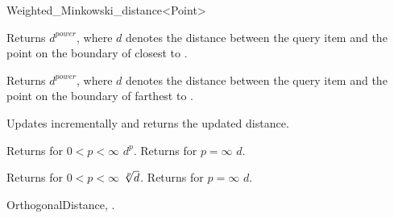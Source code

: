 \begin{ccRefClass}{Weighted_Minkowski_distance<Point>}
\ccOperations



{Returns $d^{power}$, where $d$ denotes the distance between the query item  and
the point on the boundary of  closest to .}

{Returns $d^{power}$, where $d$ denotes the distance between the query item  and
the point on the boundary of  farthest to .}

 {Updates  incrementally
and returns the updated distance.}

 {Returns for $0 < p <\infty$ $d^p$. Returns for $p=\infty$ $d$.}

 {Returns for $0 < p <\infty$ $\root p\of{d}$. Returns for $p=\infty$ $d$.}
 

\ccSeeAlso

OrthogonalDistance,
.

\end{ccRefClass}


